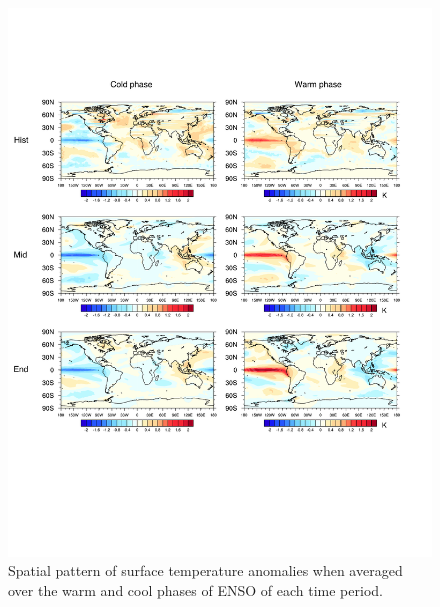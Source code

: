 \begin{figure}
\begin{center}
\includegraphics[width=6in]{supplement/sst_enso.pdf}
\caption{Spatial pattern of surface temperature anomalies when averaged over the warm and cool phases of ENSO of each time period.}
\end{center}
\label{fig:S5}
\end{figure}

